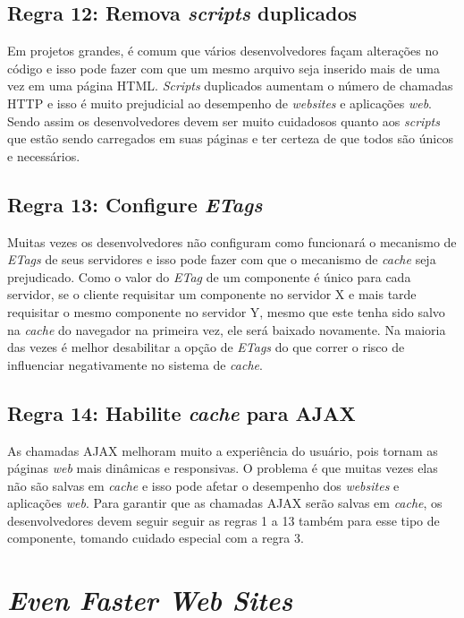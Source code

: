 \subsection{Regra 12: Remova \textit{scripts} duplicados}
\label{subsec:highperformance_regra12}
Em projetos grandes, é comum que vários desenvolvedores façam alterações no código e isso pode fazer com que um mesmo arquivo seja inserido mais de uma vez em uma página HTML. \textit{Scripts} duplicados aumentam o número de chamadas HTTP e isso é muito prejudicial ao desempenho de \textit{websites} e aplicações \textit{web}. Sendo assim os desenvolvedores devem ser muito cuidadosos quanto aos \textit{scripts} que estão sendo carregados em suas páginas e ter certeza de que todos são únicos e necessários.

\subsection{Regra 13: Configure \textit{ETags}}
\label{subsec:highperformance_regra13}
Muitas vezes os desenvolvedores não configuram como funcionará o mecanismo de \textit{ETags} de seus servidores e isso pode fazer com que o mecanismo de \textit{cache} seja prejudicado. Como o valor do \textit{ETag} de um componente é único para cada servidor, se o cliente requisitar um componente no servidor X e mais tarde requisitar o mesmo componente no servidor Y, mesmo que este tenha sido salvo na \textit{cache} do navegador na primeira vez, ele será baixado novamente. Na maioria das vezes é melhor desabilitar a opção de \textit{ETags} do que correr o risco de influenciar negativamente no sistema de \textit{cache}.

\subsection{Regra 14: Habilite \textit{cache} para AJAX}
\label{subsec:highperformance_regra14}
As chamadas AJAX melhoram muito a experiência do usuário, pois tornam as páginas \textit{web} mais dinâmicas e responsivas. O problema é que muitas vezes elas não são salvas em \textit{cache} e isso pode afetar o desempenho dos \textit{websites} e aplicações \textit{web}. Para garantir que as chamadas AJAX serão salvas em \textit{cache}, os desenvolvedores devem seguir seguir as regras 1 a 13 também para esse tipo de componente, tomando cuidado especial com a regra 3.


\section{\textit{Even Faster Web Sites}}
\label{sec:evenfasterwebsites}

